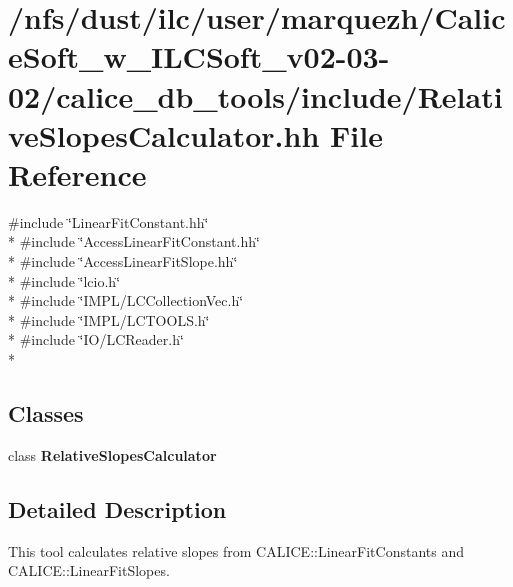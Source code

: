 \section{/nfs/dust/ilc/user/marquezh/\-Calice\-Soft\-\_\-w\-\_\-\-I\-L\-C\-Soft\-\_\-v02-\/03-\/02/calice\-\_\-db\-\_\-tools/include/\-Relative\-Slopes\-Calculator.hh File Reference}
\label{RelativeSlopesCalculator_8hh}
{\ttfamily \#include \char`\"{}Linear\-Fit\-Constant.\-hh\char`\"{}}\\*
{\ttfamily \#include \char`\"{}Access\-Linear\-Fit\-Constant.\-hh\char`\"{}}\\*
{\ttfamily \#include \char`\"{}Access\-Linear\-Fit\-Slope.\-hh\char`\"{}}\\*
{\ttfamily \#include \char`\"{}lcio.\-h\char`\"{}}\\*
{\ttfamily \#include \char`\"{}I\-M\-P\-L/\-L\-C\-Collection\-Vec.\-h\char`\"{}}\\*
{\ttfamily \#include \char`\"{}I\-M\-P\-L/\-L\-C\-T\-O\-O\-L\-S.\-h\char`\"{}}\\*
{\ttfamily \#include \char`\"{}I\-O/\-L\-C\-Reader.\-h\char`\"{}}\\*
\subsection*{Classes}
\begin{DoxyCompactItemize}
\item 
class {\bf Relative\-Slopes\-Calculator}
\end{DoxyCompactItemize}


\subsection{Detailed Description}
This tool calculates relative slopes from C\-A\-L\-I\-C\-E\-::\-Linear\-Fit\-Constants and C\-A\-L\-I\-C\-E\-::\-Linear\-Fit\-Slopes.

